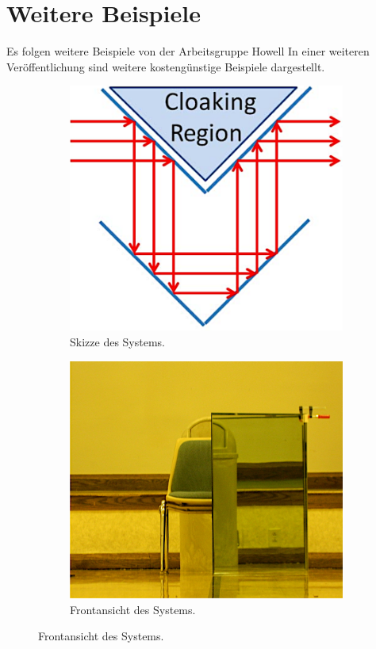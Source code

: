 \section{Weitere Beispiele}
\begin{frame}{Es folgen weitere Beispiele von der Arbeitsgruppe Howell}
    In einer weiteren Ver\"offentlichung \cite{rochester2} sind weitere kosteng\"unstige Beispiele dargestellt.
    \begin{figure}
        \centering
        \begin{subfigure}{0.48\textwidth}
            \centering
            \caption{Skizze des Systems.}
            \includegraphics[height=0.6\textheight]{images/spiegel-skizze.png}
        \end{subfigure}
        \begin{subfigure}{0.48\textwidth}
            \centering
            \caption{Frontansicht des Systems.}
            \includegraphics[height=0.6\textheight]{images/spiegel-vorne.png}

\end{subfigure}
\end{figure}
\end{frame}
